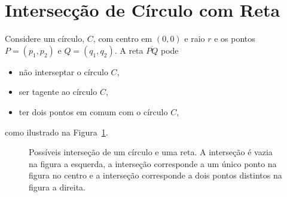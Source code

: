 %
%
%

\section{Intersecção de Círculo com Reta} \label{sse:circle_line}
Considere um círculo, $C$, com centro em $(0, 0)$ e raio $r$ e os pontos $P =
(p_1, p_2)$ e $Q = (q_1, q_2)$. A reta $\overline{PQ}$ pode
\begin{itemize}
    \item não interseptar o círculo $C$,
    \item ser tagente ao círculo $C$,
    \item ter dois pontos em comum com o círculo $C$,
\end{itemize}
como ilustrado na Figura~\ref{fig:circle_line}.
\begin{figure}[!htb]
    \centering
    \caption{Possíveis interseção de um círculo e uma reta. A interseção é
    vazia na figura a esquerda, a interseção corresponde a um único ponto na
    figura no centro e a interseção corresponde a dois pontos distintos na
    figura a direita.}
    \label{fig:circle_line}
\end{figure}


